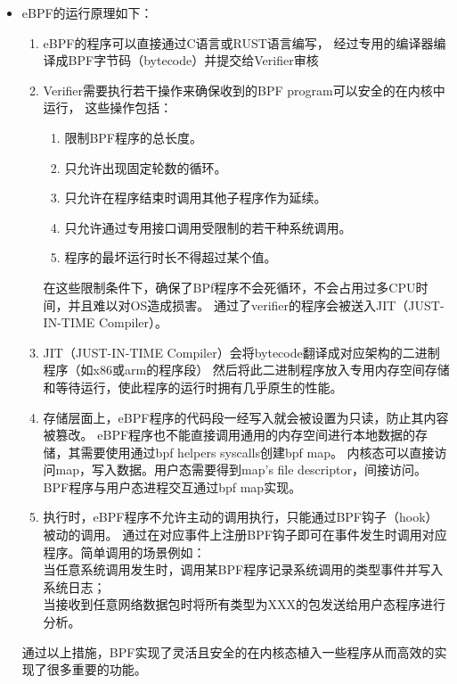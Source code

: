 \documentclass[AutoFakeBold,a4paper]{ctexart}
\begin{document}
\begin{itemize}
    \item eBPF的运行原理如下： 
    \begin{enumerate}
        \item eBPF的程序可以直接通过C语言或RUST语言编写，
        经过专用的编译器编译成BPF字节码（bytecode）并提交给Verifier审核
        \item Verifier需要执行若干操作来确保收到的BPF program可以安全的在内核中运行，
        这些操作包括：
        \begin{enumerate}
            \item 限制BPF程序的总长度。
            \item 只允许出现固定轮数的循环。
            \item 只允许在程序结束时调用其他子程序作为延续。
            \item 只允许通过专用接口调用受限制的若干种系统调用。
            \item 程序的最坏运行时长不得超过某个值。
        \end{enumerate}
        在这些限制条件下，确保了BPf程序不会死循环，不会占用过多CPU时间，并且难以对OS造成损害。
        通过了verifier的程序会被送入JIT（JUST-IN-TIME Compiler）。
        \item JIT（JUST-IN-TIME Compiler）会将bytecode翻译成对应架构的二进制程序（如x86或arm的程序段）
        然后将此二进制程序放入专用内存空间存储和等待运行，使此程序的运行时拥有几乎原生的性能。
        \item 存储层面上，eBPF程序的代码段一经写入就会被设置为只读，防止其内容被篡改。
        eBPF程序也不能直接调用通用的内存空间进行本地数据的存储，其需要使用通过bpf helpers syscalls创建bpf map。
        内核态可以直接访问map，写入数据。用户态需要得到map's file descriptor，间接访问。
        BPF程序与用户态进程交互通过bpf map实现。
        
        \item 执行时，eBPF程序不允许主动的调用执行，只能通过BPF钩子（hook）被动的调用。
        通过在对应事件上注册BPF钩子即可在事件发生时调用对应程序。简单调用的场景例如：\\
        当任意系统调用发生时，调用某BPF程序记录系统调用的类型事件并写入系统日志；\\
        当接收到任意网络数据包时将所有类型为XXX的包发送给用户态程序进行分析。
    \end{enumerate}
    通过以上措施，BPF实现了灵活且安全的在内核态植入一些程序从而高效的实现了很多重要的功能。


\end{itemize}
\end{document}
